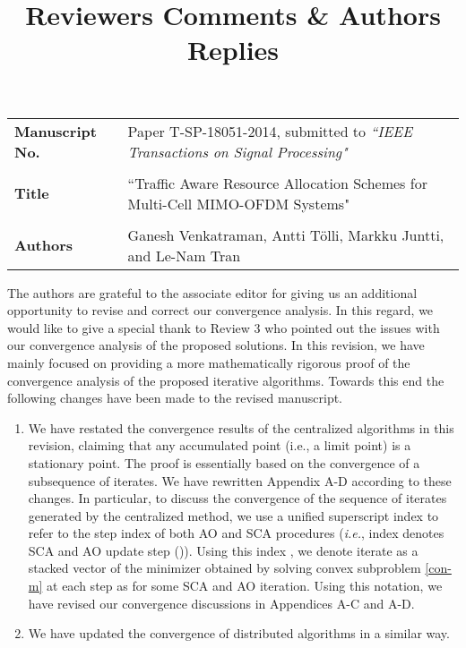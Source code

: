 \documentclass[10pt,letterpaper,onecolumn]{article}
\begin{document}
	
	\title{Reviewers Comments \& Authors Replies}
	
	\date{}
	\maketitle
	
	\begin{tabular}{p{1.25in}p{4.25in}}
		\textbf{Manuscript No.} & Paper T-SP-18051-2014, submitted to \emph{``IEEE Transactions on Signal Processing"} \\ \\
		\textbf{Title} & ``Traffic Aware Resource Allocation Schemes for Multi-Cell MIMO-OFDM Systems" \\ \\
		\textbf{Authors} & Ganesh Venkatraman, Antti T\"{o}lli, Markku Juntti, and Le-Nam Tran
	\end{tabular}
	
	\vspace{0.35in}
	The authors are grateful to the associate editor for giving us an additional opportunity to revise and correct our convergence analysis. In this regard, we would like to give a special thank to Review 3 who pointed out the issues with our convergence analysis of the proposed solutions. In this revision, we have mainly focused on providing a more mathematically rigorous  proof of the convergence analysis of the proposed iterative algorithms.
	Towards this end the following changes have been made to the revised manuscript.
	\begin{enumerate}
		\item We have restated the convergence results of the centralized algorithms in this revision, claiming that any accumulated point (i.e., a limit point) is a stationary point. The proof is essentially based on the convergence of a subsequence of iterates. We have rewritten Appendix A-D according to these changes. In particular, to discuss the convergence of the sequence of iterates generated by the centralized method, we use a unified superscript index  to refer to the step index of both \ac{AO} and \ac{SCA} procedures (\textit{i.e.}, index  denotes \ac{SCA} and \ac{AO} update step ()). Using this index , we denote iterate  as a stacked vector of the minimizer obtained by solving convex subproblem \eqref{con-m} at each step  as  for some \ac{SCA} and \ac{AO} iteration. Using this notation, we have revised our convergence discussions in Appendices A-C and A-D.		
		\item We have updated the convergence of distributed algorithms in a similar way.
	\end{enumerate}
	
\end{document}

